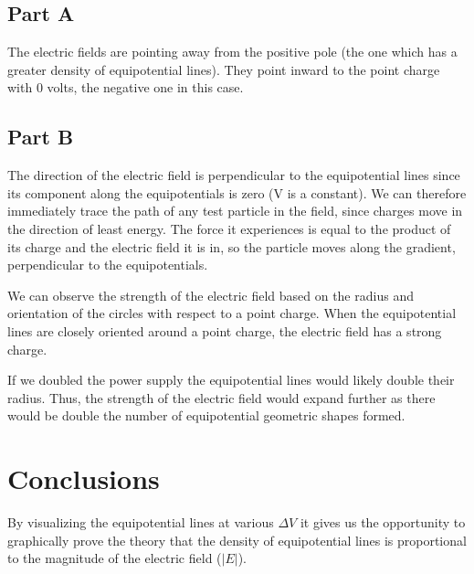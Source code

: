 \documentclass[twocolumn]{article}
\begin{document}
\subsection{Part A}\label{sub:part_a}
The electric fields are pointing away from the positive pole (the one which has a greater density of equipotential lines).  They point inward to the point charge with 0 volts, the negative one in this case.

\subsection{Part B}\label{sub:part_b}
The direction of the electric field is perpendicular to the 
equipotential lines since its component along the equipotentials is zero (V 
is a constant). We can therefore immediately trace the path of any test particle in the 
field, since charges move in the direction of least energy. The force it experiences is 
equal to the product of its charge and the electric field it is in, so the particle moves 
along the gradient, perpendicular to the equipotentials.

We can observe the strength of the electric field based on the radius and orientation of the circles with respect to a point charge.  When the equipotential lines are closely oriented around a point charge, the electric field has a strong charge.

If we doubled the power supply the equipotential lines would likely double their radius.  Thus, the strength of the electric field would expand further as there would be double the number of equipotential geometric shapes formed.

\section{Conclusions}\label{sec:conclusions}
By visualizing the equipotential lines at various $\Delta V$ it gives us the opportunity to graphically prove the theory that the density of equipotential lines is proportional to the magnitude of the electric field ($|E|$).
\end{document}
